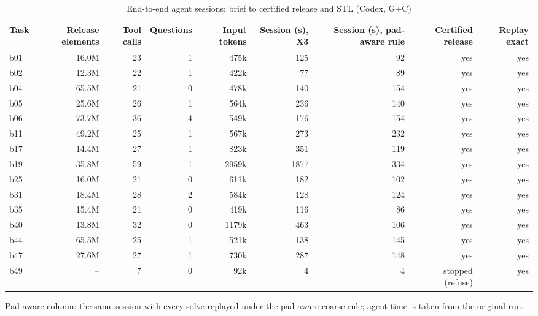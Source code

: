 \begin{table}[t]
\centering\small
\caption{End-to-end agent sessions: brief to certified release and STL (Codex, G+C)}
\label{tab:t8_x3_sessions}
\begin{tabular}{lrrrrrrrr}
\toprule
Task & Release elements & Tool calls & Questions & Input tokens & Session (s), X3 & Session (s), pad-aware rule & Certified release & Replay exact \\
\midrule
b01 & 16.0M & 23 & 1 & 475k & 125 & 92 & yes & yes \\
b02 & 12.3M & 22 & 1 & 422k & 77 & 89 & yes & yes \\
b04 & 65.5M & 21 & 0 & 478k & 140 & 154 & yes & yes \\
b05 & 25.6M & 26 & 1 & 564k & 236 & 140 & yes & yes \\
b06 & 73.7M & 36 & 4 & 549k & 176 & 154 & yes & yes \\
b11 & 49.2M & 25 & 1 & 567k & 273 & 232 & yes & yes \\
b17 & 14.4M & 27 & 1 & 823k & 351 & 119 & yes & yes \\
b19 & 35.8M & 59 & 1 & 2959k & 1877 & 334 & yes & yes \\
b25 & 16.0M & 21 & 0 & 611k & 182 & 102 & yes & yes \\
b31 & 18.4M & 28 & 2 & 584k & 128 & 124 & yes & yes \\
b35 & 15.4M & 21 & 0 & 419k & 116 & 86 & yes & yes \\
b40 & 13.8M & 32 & 0 & 1179k & 463 & 106 & yes & yes \\
b44 & 65.5M & 25 & 1 & 521k & 138 & 145 & yes & yes \\
b47 & 27.6M & 27 & 1 & 730k & 287 & 148 & yes & yes \\
b49 & -- & 7 & 0 & 92k & 4 & 4 & stopped (refuse) & yes \\
\bottomrule
\end{tabular}
\par\smallskip\footnotesize Pad-aware column: the same session with every solve replayed under the pad-aware coarse rule; agent time is taken from the original run.
\end{table}
